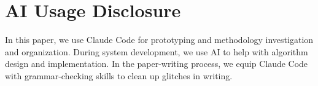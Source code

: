 \documentclass{article}
\begin{document}

\printAffiliationsAndNotice{}




% 





\section*{AI Usage Disclosure}
In this paper, we use Claude Code for prototyping and methodology investigation and organization. During system development, we use AI to help with algorithm design and implementation. In the paper-writing process, we equip Claude Code with grammar-checking skills to clean up glitches in writing.


\end{document}
